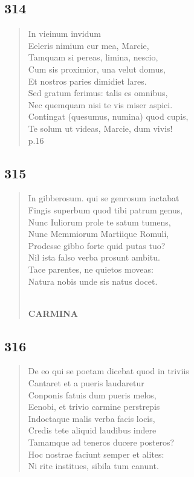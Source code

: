 \documentclass[11pt, a4paper]{report}
\begin{document}
            \subsection*{314}
      \begin{verse}
      In vieinum invidum \\ Eeleris nimium cur mea, Marcie, \\ Tamquam si pereas, limina, nescio, \\ Cum sis proximior, una velut domus, \\ Et nostros paries dimidiet lares. \\ Sed gratum ferimus: talis es omnibus, \\ Nec quemquam nisi te  \lbrack vis \rbrack  miser aspici. \\ Contingat (quesumus, numina) quod cupis, \\ Te solum ut videas, Marcie, dum vivis! \\ p.16 \\ 
      \end{verse}
  
            \subsection*{315}
      \begin{verse}
      In gibberosum. qui se genrosum iactabat \\ Fingis superbum quod tibi patrum genus, \\ Nunc Iuliorum prole te satum tumens, \\ Nunc Memmiorum Martiique Romuli, \\ Prodesse gibbo forte quid putas tuo? \\ Nil ista falso verba prosunt ambitu. \\ Tace parentes, ne quietos moveas: \\ Natura nobis unde sis natus docet. \\ 
        ﻿\pagebreak 
    \begin{center} \textbf{CARMINA} \end{center} \marginpar{[262]} 
      \end{verse}
  
            \subsection*{316}
      \begin{verse}
      De eo qui se poetam dicebat quod in triviis \\ Cantaret et a pueris laudaretur \\ Conponis fatuis dum pueris melos, \\ Eenobi, et trivio carmine perstrepis \\ Indoctaque malis verba facis locis, \\ Credis tete aliquid laudibus indere \\ Tamamque ad teneros ducere posteros? \\ Hoc nostrae faciunt semper et alites: \\ Ni rite institues, sibila tum canunt. \\ 
      \end{verse}
  
\end{document}
